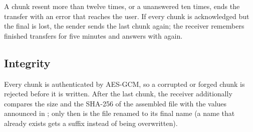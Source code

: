 A chunk resent more than twelve times, or a  unanswered ten times, ends the transfer with
an error that reaches the user. If every chunk is acknowledged but the final  is lost,
the sender sends the last chunk again; the receiver remembers finished transfers for five minutes and
answers with  again.


\subsection{Integrity}
Every chunk is authenticated by AES-GCM, so a corrupted or forged chunk is rejected before it is
written. After the last chunk, the receiver additionally compares the size and the SHA-256 of the
assembled file with the values announced in ; only then is the file renamed to its final
name (a name that already exists gets a suffix instead of being overwritten).
